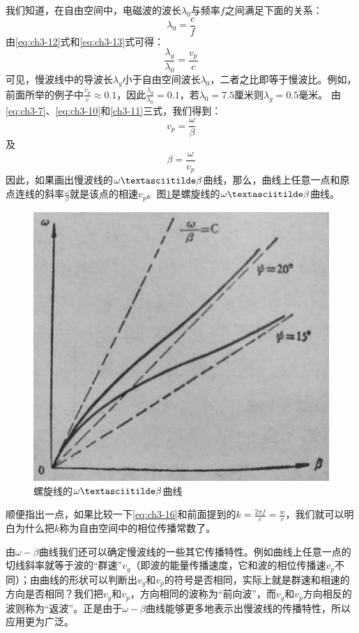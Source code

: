 我们知道，在自由空间中，电磁波的波长$ \lambda_0 $与频率$ f $之间满足下面的关系：
\begin{equation} \label{eq:ch3-13}
	\lambda_0 = \frac{c}{f}
\end{equation}
由\eqref{eq:ch3-12}式和\eqref{eq:ch3-13}式可得：
\begin{equation} \label{eq:ch3-14}
	\frac{\lambda_g}{\lambda_0} = \frac{v_p}{c}
\end{equation}
可见，慢波线中的导波长$ \lambda_g $小于自由空间波长$ \lambda_0 $，二者之比即等于慢波比。例如，前面所举的例子中$\frac{v_p}{c}  \approx 0.1$，因此$ \frac{\lambda_g}{\lambda_0} = 0.1$，若$ \lambda_0 = 7.5 $厘米则$ \lambda_g=0.5 $毫米。 由\eqref{eq:ch3-7}、\eqref{eq:ch3-10}和\eqref{ch3-11}三式，我们得到：
\begin{equation} \label{eq:ch3-15}
	v_p =\frac{\omega}{\beta}
\end{equation}及
\begin{equation}\label{eq:ch3-16}
	 \beta = \frac{\omega}{v_p}
\end{equation}
 因此，如果画出慢波线的$ \omega \textasciitilde \beta $曲线，那么，曲线上任意一点和原点连线的斜率$ \frac{\omega}{\beta} $就是该点的相速$ v_p $。图\ref{ch3-4}是螺旋线的$ \omega \textasciitilde \beta $曲线。
 
 \begin{figure}[phtb]
 	\centering
 	\includegraphics[width=0.42\linewidth]{figure/ch3-4}
 	\caption{螺旋线的$ \omega \textasciitilde \beta $曲线}
 	\label{ch3-4}
 \end{figure}
 
 顺便指出一点，如果比较一下\eqref{eq:ch3-16}和前面提到的$ k = \frac{2\pi f}{c} = \frac{w}{c} $，我们就可以明白为什么把$ k $称为自由空间中的相位传播常数了。
 
 由$ \omega - \beta $曲线我们还可以确定慢波线的一些其它传播特性。例如曲线上任意一点的切线斜率就等于波的“群速”$ v_g $（即波的能量传播速度，它和波的相位传播速$ v_p $不同）；由曲线的形状可以判断出$ v_g $和$ v_p $的符号是否相同，实际上就是群速和相速的方向是否相同？我们把$ v_g $和$ v_p $，方向相同的波称为“前向波”，而$ v_g $和$ v_p $方向相反的波则称为“返波”。正是由于$ \omega - \beta $曲线能够更多地表示出慢波线的传播特性，所以应用更为广泛。

